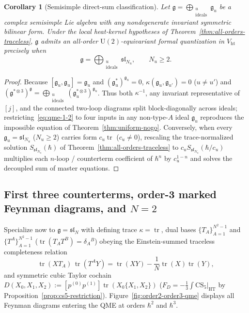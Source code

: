 \documentclass[11pt,letterpaper]{article}
\numberwithin{equation}{section}
\theoremstyle{plain}
\newtheorem{corollary}[theorem]{Corollary}
\theoremstyle{definition}
\theoremstyle{remark}
\newcommand{\fg}{\mathfrak{g}}
\newcommand{\fsl}{\mathfrak{sl}}
\newcommand{\tr}{\operatorname{tr}}
\newcommand{\Vht}{V_{\mathrm{ht}}}
\begin{document}
\begin{corollary}[Semisimple direct-sum classification]
\label{cor:semisimple-class}
Let $\fg = \bigoplus_{\substack{u\\\mathrm{ideals}}}\fg_u$ be a complex semisimple Lie algebra with any nondegenerate invariant symmetric bilinear form. Under the local heat-kernel hypotheses of Theorem~\ref{thm:all-orders-traceless}, $\fg$ admits an all-order $\mathrm{U}(2)$-equivariant formal quantization in $\Vht$ precisely when
\begin{equation}
\label{eq:semisimple-iff}
\fg = \bigoplus_{\substack{u\\\mathrm{ideals}}} \fsl_{N_u}, \qquad N_u \ge 2.
\end{equation}
\end{corollary}

\begin{proof}
Because $[\fg_u,\fg_u]=\fg_u$ and $(\fg_u^*)^{\fg_u}=0$, $\kappa(\fg_u,\fg_{u'}) = 0$ ($u \neq u'$) and $(\fg^{*\otimes 3})^{\fg} = \bigoplus_{\substack{u\\\mathrm{ideals}}}(\fg_u^{*\otimes 3})^{\fg_u}$. Thus both $\kappa^{-1}$, any invariant representative of $[j]$, and the connected two-loop diagrams split block-diagonally across ideals; restricting~\eqref{eq:qme-1-2} to four inputs in any non-type-$A$ ideal $\fg_u$ reproduces the impossible equation of Theorem~\ref{thm:uniform-nogo}. Conversely, when every $\fg_u = \fsl_{N_u}$ ($N_u \ge 2$) carries form $c_u\tr$ ($c_u \neq 0$), rescaling the trace-normalized solution $S_{\fsl_{N_u}}(\hbar)$ of Theorem~\ref{thm:all-orders-traceless} to $c_u S_{\fsl_{N_u}}(\hbar/c_u)$ multiplies each $n$-loop / counterterm coefficient of $\hbar^n$ by $c_u^{1-n}$ and solves the decoupled sum of master equations.
\end{proof}

\subsection{First three counterterms, order-3 marked Feynman diagrams, and $N = 2$}
\label{subsec:first-three}

Specialize now to $\fg = \fsl_N$ with defining trace $\kappa = \tr$, dual bases $\{T_A\}_{A=1}^{N^2-1}$ and $\{T^A\}_{A=1}^{N^2-1}$ ($\tr(T_A T^B) = \delta_A{}^B$) obeying the Einstein-summed traceless completeness relation
\begin{equation}
\label{eq:traceless-completeness}
\tr(X T_A)\,\tr(T^A Y) = \tr(XY) - \frac{1}{N}\tr(X)\tr(Y),
\end{equation}
and symmetric cubic Taylor cochain $D(X_0,X_1,X_2) := [p^{(0)}p^{(1)}]\tr(X_0\{X_1,X_2\})$ ($F_D = -\frac{1}{3}\int\mathrm{CS}_5|_{\mathrm{HT}}$ by Proposition~\ref{prop:cs5-restriction}). Figure~\ref{fig:order2-order3-qme} displays all Feynman diagrams entering the QME at orders $\hbar^2$ and $\hbar^3$.
\end{document}
